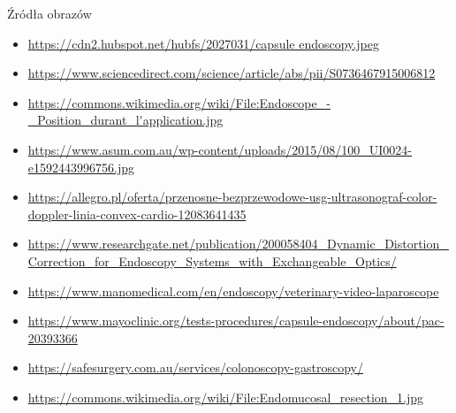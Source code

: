 \documentclass[aspectratio=43]{beamer}
\begin{document}
\begin{frame}{Źródła obrazów}{}
    \scriptsize
    \begin{itemize}
    \item \url{https://cdn2.hubspot.net/hubfs/2027031/capsule endoscopy.jpeg}
    \item \url{https://www.sciencedirect.com/science/article/abs/pii/S0736467915006812}
    \item \url{https://commons.wikimedia.org/wiki/File:Endoscope_-_Position_durant_l'application.jpg}
    \item \url{https://www.asum.com.au/wp-content/uploads/2015/08/100_UI0024-e1592443996756.jpg}
    \item \url{https://allegro.pl/oferta/przenosne-bezprzewodowe-usg-ultrasonograf-color-doppler-linia-convex-cardio-12083641435}
    \item \url{https://www.researchgate.net/publication/200058404_Dynamic_Distortion_Correction_for_Endoscopy_Systems_with_Exchangeable_Optics/}
    \item \url{https://www.manomedical.com/en/endoscopy/veterinary-video-laparoscope}
    \item \url{https://www.mayoclinic.org/tests-procedures/capsule-endoscopy/about/pac-20393366}
    \item \url{https://safesurgery.com.au/services/colonoscopy-gastroscopy/}
    \item \url{https://commons.wikimedia.org/wiki/File:Endomucosal_resection_1.jpg}
    \end{itemize}
\end{frame}
\end{document}
